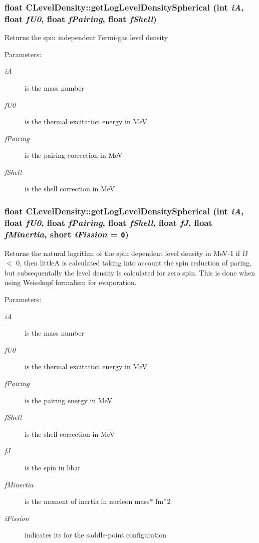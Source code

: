 \subsubsection{\setlength{\rightskip}{0pt plus 5cm}float CLevel\-Density::get\-Log\-Level\-Density\-Spherical (int {\em i\-A}, float {\em f\-U0}, float {\em f\-Pairing}, float {\em f\-Shell})}\label{classCLevelDensity_f91006c52fab6772f9a98868cf03425c}


Returns the spin independent Fermi-gas level density \begin{Desc}
\item[Parameters:]
\begin{description}
\item[{\em i\-A}]is the mass number \item[{\em f\-U0}]is the thermal excitation energy in Me\-V \item[{\em f\-Pairing}]is the pairing correction in Me\-V \item[{\em f\-Shell}]is the shell correction in Me\-V \end{description}
\end{Desc}
\subsubsection{\setlength{\rightskip}{0pt plus 5cm}float CLevel\-Density::get\-Log\-Level\-Density\-Spherical (int {\em i\-A}, float {\em f\-U0}, float {\em f\-Pairing}, float {\em f\-Shell}, float {\em f\-J}, float {\em f\-Minertia}, short {\em i\-Fission} = {\tt 0})}\label{classCLevelDensity_4bac625039f18d6d02c6a72070ae3ff3}


Returns the natural logrithm of the spin dependent level density in Me\-V-1 if f\-J $<$ 0, then little\-A is calculated taking into account the spin reduction of paring, but subsequentally the level density is calculated for zero spin. This is done when using Weisskopf formalism for evaporation. \begin{Desc}
\item[Parameters:]
\begin{description}
\item[{\em i\-A}]is the mass number \item[{\em f\-U0}]is the thermal excitation energy in Me\-V \item[{\em f\-Pairing}]is the pairing energy in Me\-V \item[{\em f\-Shell}]is the shell correction in Me\-V \item[{\em f\-J}]is the spin in hbar \item[{\em f\-Minertia}]is the moment of inertia in nucleon mass$\ast$ fm$^\wedge$2 \item[{\em i\-Fission}]indicates its for the saddle-point configuration \end{description}
\end{Desc}
